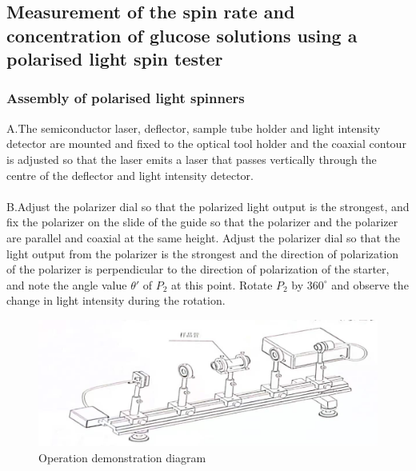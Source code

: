 \documentclass[UTF8]{article}
\begin{document}
	\subsection{Measurement of the spin rate and concentration of glucose solutions using a polarised light spin tester}
	\subsubsection{Assembly of polarised light spinners}
	A.The semiconductor laser, deflector, sample tube holder and light intensity detector are mounted and fixed to the optical tool holder and the coaxial contour is adjusted so that the laser emits a laser that passes vertically through the centre of the deflector and light intensity detector.
	\\
	\\B.Adjust the polarizer dial so that the polarized light output is the strongest, and fix the polarizer on the slide of the guide so that the polarizer and the polarizer are parallel and coaxial at the same height. Adjust the polarizer dial so that the light output from the polarizer is the strongest and the direction of polarization of the polarizer is perpendicular to the direction of polarization of the starter, and note the angle value ${\theta  }'   $ of $P_{2} $ at this point. Rotate $P_{2} $ by $360^\circ$ and observe the change in light intensity during the rotation.
	 \begin{figure}[H]
		\centering
		\includegraphics[clip,scale=0.2,trim={0 0 0 10}]{figure/fig10.jpg}
		\caption{Operation demonstration diagram}
		\label{figure.9}
	\end{figure}
	
\end{document}
